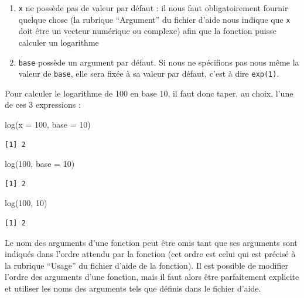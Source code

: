 \documentclass[
  a4paper,
  DIV=11,
  numbers=noendperiod,
  oneside]{scrreprt}
\newenvironment{Shaded}{}{}
\newcommand{\AttributeTok}[1]{\textcolor[rgb]{0.84,0.23,0.29}{#1}}
\newcommand{\DecValTok}[1]{\textcolor[rgb]{0.00,0.36,0.77}{#1}}
\newcommand{\FunctionTok}[1]{\textcolor[rgb]{0.44,0.26,0.76}{#1}}
\newcommand{\NormalTok}[1]{\textcolor[rgb]{0.14,0.16,0.18}{#1}}
\providecommand{\tightlist}{%
  \setlength{\itemsep}{0pt}\setlength{\parskip}{0pt}}\usepackage{longtable,booktabs,array}
\begin{document}
\begin{enumerate}
\def\labelenumi{\arabic{enumi}.}
\tightlist
\item
  \texttt{x} ne possède pas de valeur par défaut : il nous faut
  obligatoirement fournir quelque chose (la rubrique ``Argument'' du
  fichier d'aide nous indique que \texttt{x} doit être un vecteur
  numérique ou complexe) afin que la fonction puisse calculer un
  logarithme
\item
  \texttt{base} possède un argument par défaut. Si nous ne spécifions
  pas nous même la valeur de \texttt{base}, elle sera fixée à sa valeur
  par défaut, c'est à dire \texttt{exp(1)}.
\end{enumerate}

Pour calculer le logarithme de 100 en base 10, il faut donc taper, au
choix, l'une de ces 3 expressions :

\begin{Shaded}
\begin{Highlighting}[]
\FunctionTok{log}\NormalTok{(}\AttributeTok{x =} \DecValTok{100}\NormalTok{, }\AttributeTok{base =} \DecValTok{10}\NormalTok{)}
\end{Highlighting}
\end{Shaded}

\begin{verbatim}
[1] 2
\end{verbatim}

\begin{Shaded}
\begin{Highlighting}[]
\FunctionTok{log}\NormalTok{(}\DecValTok{100}\NormalTok{, }\AttributeTok{base =} \DecValTok{10}\NormalTok{)}
\end{Highlighting}
\end{Shaded}

\begin{verbatim}
[1] 2
\end{verbatim}

\begin{Shaded}
\begin{Highlighting}[]
\FunctionTok{log}\NormalTok{(}\DecValTok{100}\NormalTok{, }\DecValTok{10}\NormalTok{)}
\end{Highlighting}
\end{Shaded}

\begin{verbatim}
[1] 2
\end{verbatim}

Le nom des arguments d'une fonction peut être omis tant que ses
arguments sont indiqués dans l'ordre attendu par la fonction (cet ordre
est celui qui est précisé à la rubrique ``Usage'' du fichier d'aide de
la fonction). Il est possible de modifier l'ordre des arguments d'une
fonction, mais il faut alors être parfaitement explicite et utiliser les
noms des arguments tels que définis dans le fichier d'aide.
\end{document}
